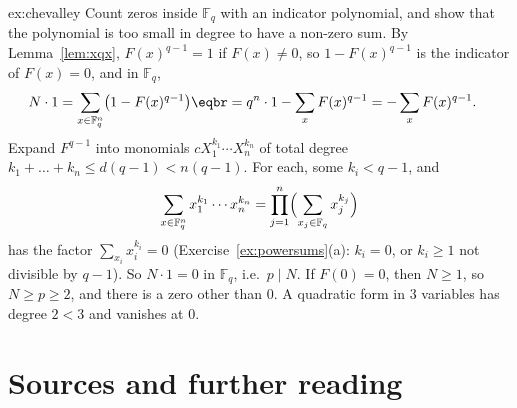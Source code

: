 \begin{solution}{ex:chevalley}
\idea Count zeros inside $\mathbb F_q$ with an indicator polynomial, and show that the polynomial is too small in degree to have a non-zero sum.
\writeup By Lemma~\ref{lem:xqx}, $F(x)^{q-1}=1$ if $F(x)\ne0$, so $1-F(x)^{q-1}$ is the indicator of $F(x)=0$, and in $\mathbb F_q$,
\[
\begin{aligned}N\cdot1&=\sum_{x\in\mathbb F_q^n}\bigl(1-F(x)^{q-1}\bigr)\eqbr=q^n\cdot1-\sum_{x}F(x)^{q-1}=-\sum_xF(x)^{q-1}.\end{aligned}
\]
Expand $F^{q-1}$ into monomials $cX_1^{k_1}\cdots X_n^{k_n}$ of total degree $k_1+\dots+k_n\le d(q-1)<n(q-1)$. For each, some $k_i<q-1$, and
\[
\sum_{x\in\mathbb F_q^n}x_1^{k_1}\cdots x_n^{k_n}=\prod_{j=1}^n\Bigl(\sum_{x_j\in\mathbb F_q}x_j^{k_j}\Bigr)
\]
has the factor $\sum_{x_i}x_i^{k_i}=0$ (Exercise~\ref{ex:powersums}(a): $k_i=0$, or $k_i\ge1$ not divisible by $q-1$). So $N\cdot1=0$ in $\mathbb F_q$, i.e.\ $p\mid N$. If $F(0)=0$, then $N\ge1$, so $N\ge p\ge2$, and there is a zero other than $0$. A quadratic form in $3$ variables has degree $2<3$ and vanishes at $0$.
\end{solution}

\section*{Sources and further reading}

